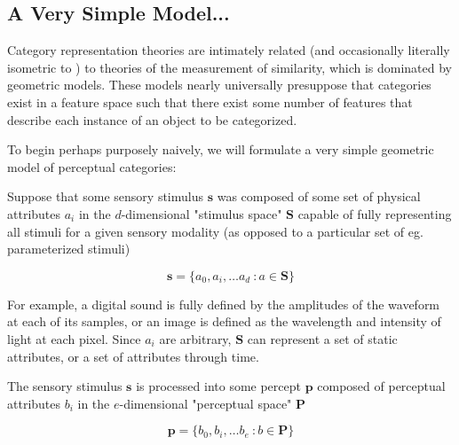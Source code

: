 \begin{multicols}{2}

\subsection{A Very Simple Model...}

Category representation theories are intimately related (and occasionally literally isometric to \cite{Edelman1998}) to theories of the measurement of similarity, which is dominated by geometric models\cite{Tversky1977}. These models nearly universally presuppose that categories exist in a feature space such that there exist some number of features that describe each instance of an object to be categorized.

To begin perhaps purposely naively, we will formulate a very simple geometric model of perceptual categories:

Suppose that some sensory stimulus $\mathbf{s}$ was composed of some set of physical attributes $a_i$ in the $d$-dimensional "stimulus space" $\mathbf{S}$ capable of fully representing all stimuli for a given sensory modality (as opposed to a particular set of eg. parameterized stimuli)

\begin{equation}
\label{eqn:s}
\mathbf{s} = \{a_0, a_i, \dots a_d\ : a \in \mathbf{S}\}
\end{equation}

For example, a digital sound is fully defined by the amplitudes of the waveform at each of its samples, or an image is defined as the wavelength and intensity of light at each pixel.  Since $a_i$ are arbitrary, $\mathbf{S}$ can represent a set of static attributes, or a set of attributes through time.

The sensory stimulus $\mathbf{s}$ is processed into some percept $\mathbf{p}$ composed of perceptual attributes $b_i$ in the $e$-dimensional "perceptual space" $\mathbf{P}$

\begin{equation}
\label{eqn:p}
\mathbf{p} = \{b_0, b_i, \dots b_e\ : b \in \mathbf{P}\}
\end{equation}


\end{multicols}
